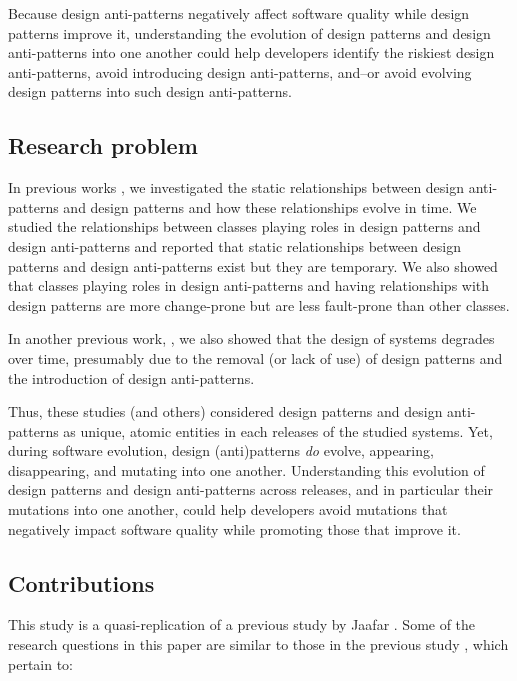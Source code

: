 Because design anti-patterns negatively affect software quality while design patterns improve it, understanding the evolution of design patterns and design anti-patterns into one another could help developers identify the riskiest design anti-patterns, avoid introducing design anti-patterns, and--or avoid evolving design patterns into such design anti-patterns.



\subsection{Research problem}

In previous works \cite{jaafar2013analysing,jaafar2014anti}, we investigated the static relationships between design anti-patterns and design patterns and how these relationships evolve in time. We studied the relationships between classes playing roles in design patterns and design anti-patterns and reported that static relationships between design patterns and design anti-patterns exist but they are temporary. We also showed that classes playing roles in design anti-patterns and having relationships with design patterns are more change-prone but are less fault-prone than other classes.

In another previous work, \cite{khomh2008design}, we also showed that the design of systems degrades over time, presumably due to the removal (or lack of use) of design patterns and the introduction of design anti-patterns. 

Thus, these studies (and others) considered design patterns and design anti-patterns as unique, atomic entities in each releases of the studied systems. Yet, during software evolution, design (anti)patterns \emph{do} evolve, appearing, disappearing, and mutating into one another. Understanding this evolution of design patterns and design anti-patterns across releases, and in particular their mutations into one another, could help developers avoid mutations that negatively impact software quality while promoting those that improve it.



\subsection{Contributions}

This study is a quasi-replication of a previous study by Jaafar \etal \cite{jaafar2014anti}. Some of the research questions in this paper are similar to those in the previous study \cite{jaafar2014anti}, which pertain to:

